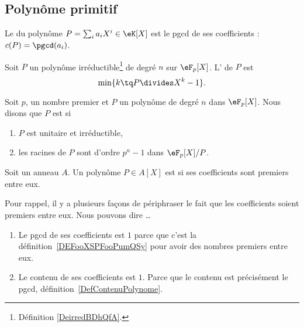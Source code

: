 \subsection{Polynôme primitif}

\begin{definition}\label{DefContenuPolynome}
	Le  du polynôme \( P=\sum_ia_iX^i\in\eK[X]\) est le pgcd de ses coefficients : \( c(P)=\pgcd(a_i)\).
\end{definition}

\begin{definition}
	Soit \( P\) un polynôme irréductible\footnote{Définition \ref{DeirredBDhQfA}.} de degré \( n\) sur \( \eF_p[X]\). L' de \( P\) est
	\begin{equation}
		\min\{ k\tq P\divides X^k-1 \}.
	\end{equation}
\end{definition}

\begin{definition}           \label{DEFooDVOOooKaPZQC}
	Soit \( p\), un nombre premier et \( P\) un polynôme de degré \( n\) dans \( \eF_p[X]\). Nous disons que \( P\) est  si
	\begin{enumerate}
		\item
		      \( P\) est unitaire et irréductible,
		\item
		      les racines de \( P\) sont d'ordre \( p^n-1\) dans \( \eF_p[X]/P\).
	\end{enumerate}
\end{definition}

\begin{definition}       \label{DEFooAIYGooRAEfHU}
	Soit un anneau \( A\). Un polynôme \( P\in A[X]\) est  si ses coefficients sont premiers entre eux.
\end{definition}

\begin{normaltext}
	Pour rappel, il y a plusieurs façons de périphraser le fait que les coefficients soient premiers entre eux. Nous pouvons dire \ldots
	\begin{enumerate}
		\item
		      Le pgcd de ses coefficients est \( 1\) parce que c'est la définition~\ref{DEFooXSPFooPumQSy} pour avoir des nombres premiers entre eux.
		\item
		      Le contenu de ses coefficients est \( 1\). Parce que le contenu est précisément le pgcd, définition~\ref{DefContenuPolynome}.
	\end{enumerate}
\end{normaltext}

